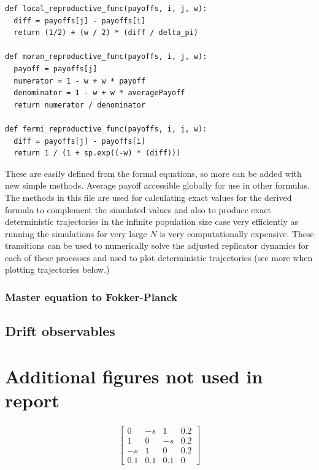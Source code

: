 \documentclass{article}
\begin{document}
\begin{verbatim}
def local_reproductive_func(payoffs, i, j, w):
  diff = payoffs[j] - payoffs[i]
  return (1/2) + (w / 2) * (diff / delta_pi)

def moran_reproductive_func(payoffs, i, j, w):
  payoff = payoffs[j]
  numerator = 1 - w + w * payoff
  denominator = 1 - w + w * averagePayoff
  return numerator / denominator

def fermi_reproductive_func(payoffs, i, j, w):
  diff = payoffs[j] - payoffs[i]
  return 1 / (1 + sp.exp((-w) * (diff)))

\end{verbatim}
These are easily defined from the formal equations, so more can 
be added with new simple methods.
Average payoff accessible globally for use in other formulas.
The methods in this file are used for calculating
exact values for the derived formula to complement the 
simulated values and also to produce exact deterministic
trajectories in the infinite population size case very 
efficiently as running the simulations for very large $N$ is 
very computationally expensive.
These transitions can be used to numerically solve the 
adjusted replicator dynamics for each of these processes and used
to plot deterministic trajectories (see more when plotting 
trajectories below.)



\subsubsection{Master equation to Fokker-Planck}









\newpage
\subsection{Drift observables}






\newpage
\section{Additional figures not used in report}


\begin{align} \label{AugRpsA}
\begin{bmatrix}
    0 & -s & 1 & 0.2\\
    1 & 0 & -s & 0.2\\
    -s & 1 & 0 & 0.2\\
    0.1 & 0.1 & 0.1 & 0
\end{bmatrix}
\end{align}
\end{document}
